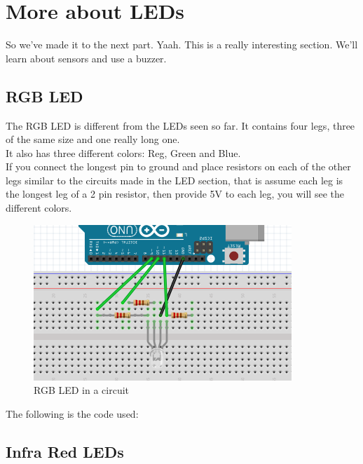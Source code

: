 \documentclass[14pt]{memoir}
\begin{document}
\chapter{More about LEDs}
So we've made it to the next part. Yaah. This is a really
interesting section. We'll learn about sensors and use a buzzer.

\section*{RGB LED}
The RGB LED is different from the LEDs seen so far. It contains
four legs, three of the same size and one really long one.
\\
It also has three different colors: Reg, Green and Blue.
\\
If you connect the longest pin to ground and place resistors on
each of the other legs similar to the circuits made in the LED
section, that is assume each leg is the longest leg of a 2 pin
resistor, then provide 5V to each leg, you will see the different
colors.
\\
\begin{figure}[H]
    \includegraphics[width=\linewidth]{circuit_images/rgb_led.png}
    \caption{RGB LED in a circuit}
\end{figure}

The following is the code used:



\section*{Infra Red LEDs}
\end{document}
